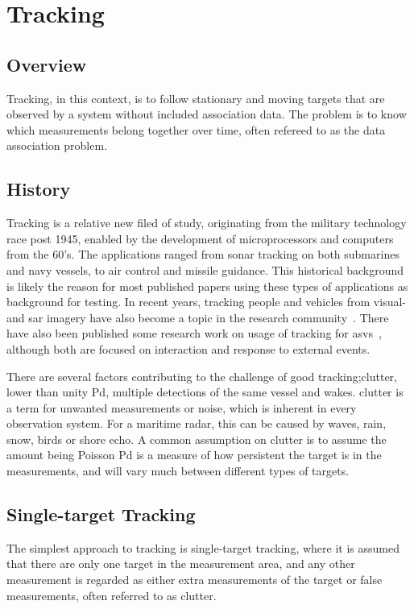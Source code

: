 \section{Tracking}
\subsection{Overview}
Tracking, in this context, is to follow stationary and moving targets that are observed by a system without included association data. The problem is to know which measurements belong together over time, often refereed to as the data association problem.

\subsection{History}
Tracking is a relative new filed of study, originating from the military technology race post 1945, enabled by the development of microprocessors and computers from the 60's. The applications ranged from sonar tracking on both submarines and navy vessels, to air control and missile guidance. This historical background is likely the reason for most published papers using these types of applications as background for testing. In recent years, tracking people and vehicles from visual- and \gls{sar} imagery have also become a topic in the research community~\cite{Carthel2007,Carthel2007a,Coraluppi2000}. There have also been published some research work on usage of tracking for \glspl{asv}~\cite{Wolf2010,Svec2014}, although both are focused on interaction and response to external events.

There are several factors contributing to the challenge of good tracking;\gls{clutter}, lower than unity \gls{Pd}, multiple detections of the same vessel and wakes. \Gls{clutter} is a term for unwanted measurements or noise, which is inherent in every observation system. For a maritime radar, this can be caused by waves, rain, snow, birds or shore echo. A common assumption on clutter is to assume the amount being Poisson \gls{Pd} is a measure of how persistent the target is in the measurements, and will vary much  between different types of targets. 

\subsection{Single-target Tracking}
The simplest approach to tracking is single-target tracking, where it is assumed that there are only one target in the measurement area, and any other measurement is regarded as either extra measurements of the target or false measurements, often referred to as \gls{clutter}.

